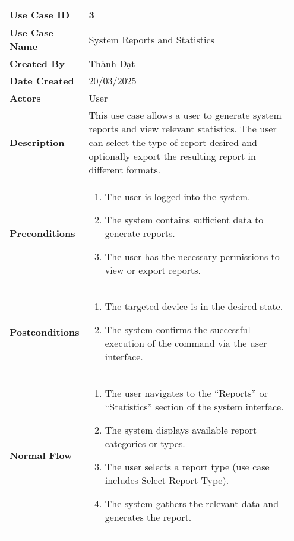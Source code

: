 \begin{longtable}{|>{\centering\arraybackslash}p{0.2\linewidth}|p{0.75\linewidth}|}
    \hline
    \textbf{Use Case ID} & 3 \\ \hline
    \textbf{Use Case Name} & System Reports and Statistics \\ \hline
    \textbf{Created By} & Thành Đạt \\ \hline
    \textbf{Date Created} & 20/03/2025 \\ \hline
    \textbf{Actors} & User \\ \hline
    \textbf{Description} & This use case allows a user to generate system reports and view relevant statistics. The user can select the type of report desired and optionally export the resulting report in different formats. \\ \hline
    \textbf{Preconditions} & 
    \begin{enumerate}[left=0pt,label=\arabic*.,nosep,topsep=0pt,itemsep=0pt,partopsep=0pt]
        \item The user is logged into the system.
        \item The system contains sufficient data to generate reports.
        \item The user has the necessary permissions to view or export reports.
    \end{enumerate} \\ \hline
    \textbf{Postconditions} &
    \begin{enumerate}[left=0pt,label=\arabic*.,nosep,topsep=0pt,itemsep=0pt,partopsep=0pt]
        \item The targeted device is in the desired state.
        \item The system confirms the successful execution of the command via the user interface.
    \end{enumerate} \\ \hline
    \textbf{Normal Flow} &
    \begin{enumerate}[left=0pt,label=\arabic*.,nosep,topsep=0pt,itemsep=0pt,partopsep=0pt]
        \item The user navigates to the “Reports” or “Statistics” section of the system interface.
        \item The system displays available report categories or types.
        \item The user selects a report type (use case includes Select Report Type).
        \item The system gathers the relevant data and generates the report.

\end{enumerate}
\end{longtable}
